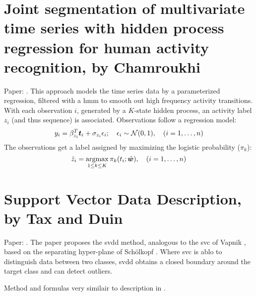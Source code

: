 \section{Joint segmentation of multivariate time series with hidden process regression for human activity recognition, by Chamroukhi}\label{sec:appendix-C-joint-segmentation}
Paper: \cite{chamroukhi2013joint}.
This approach models the time series data by a parameterized regression, filtered with a \gls{hmm} to smooth out high frequency activity transitions.
With each observation $i$, generated by a $K$-state hidden process, an activity label $z_i$ (and thus sequence) is associated.
Observations follow a regression model:
%
\begin{equation}
  y_i = \beta_{z_i}^T \vectorsym{t}_i + \sigma_{z_i} \epsilon_i; \quad \epsilon_i \sim \mathcal{N}(0,1), \quad (i=1, \dots ,n)
\end{equation}
%
The observations get a label assigned by maximizing the logistic probability ($\pi_k$):
%
\begin{equation}
  \hat{z}_i = \argmaxold \limits_{1 \leq k \leq K} \pi_k (t_i; \hat{\vectorsym{w}}), \quad (i=1, \dots, n)
\end{equation}
%






\clearpage
\section{Support Vector Data Description, by Tax and Duin}
Paper: \cite{tax2004support}.
The paper proposes the \gls{svdd} method, analogous to the \gls{svc} of Vapnik \cite{vapnik1998statistical}, based on the separating hyper-plane of Sch{\"o}lkopf \etal \cite{scholkopf1999sv}.
Where \gls{svc} is ablo to distinguish data between two classes, \gls{svdd} obtains a closed boundary around the target class and can detect outliers.

Method and formulas very similair to description in .






\clearpage

